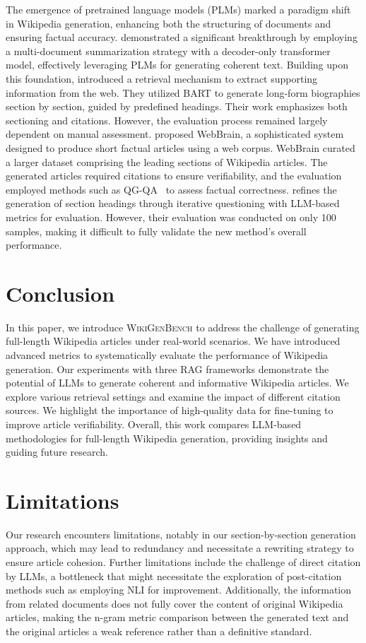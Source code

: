 \documentclass[11pt]{article}
\newcommand{\bench}{\textsc{WikiGenBench}}
\begin{document}
The emergence of pretrained language models (PLMs) marked a paradigm shift in Wikipedia generation, enhancing both the structuring of documents and ensuring factual accuracy. \citet{liu2018generating} demonstrated a significant breakthrough by employing a multi-document summarization strategy with a decoder-only transformer model, effectively leveraging PLMs for generating coherent text. Building upon this foundation, \citet{fan2022generating} introduced a retrieval mechanism to extract supporting information from the web. They utilized BART to generate long-form biographies section by section, guided by predefined headings. Their work emphasizes both sectioning and citations. However, the evaluation process remained largely dependent on manual assessment. \citet{qian2023webbrain} proposed WebBrain, a sophisticated system designed to produce short factual articles using a web corpus. WebBrain curated a larger dataset comprising the leading sections of Wikipedia articles. The generated articles required citations to ensure verifiability, and the evaluation employed methods such as QG-QA~\citep{goodrich2019assessing,wang2020asking} to assess factual correctness. 
\citet{shao2024assisting} refines the generation of section headings through iterative questioning with LLM-based metrics for evaluation. However, their evaluation was conducted on only 100 samples, making it difficult to fully validate the new method's overall performance.

\section{Conclusion}
In this paper, we introduce \bench{} to address the challenge of generating full-length Wikipedia articles under real-world scenarios. We have introduced advanced metrics to systematically evaluate the performance of Wikipedia generation. Our experiments with three RAG frameworks demonstrate the potential of LLMs to generate coherent and informative Wikipedia articles. We explore various retrieval settings and examine the impact of different citation sources. We highlight the importance of high-quality data for fine-tuning to improve article verifiability. Overall, this work compares LLM-based methodologies for full-length Wikipedia generation, providing insights and guiding future research. 


\section*{Limitations}
Our research encounters limitations, notably in our section-by-section generation approach, which may lead to redundancy and necessitate a rewriting strategy to ensure article cohesion. Further limitations include the challenge of direct citation by LLMs, a bottleneck that might necessitate the exploration of post-citation methods such as employing NLI for improvement. Additionally, the information from related documents does not fully cover the content of original Wikipedia articles, making the n-gram metric comparison between the generated text and the original articles a weak reference rather than a definitive standard. 
\end{document}
